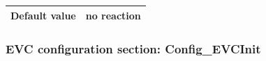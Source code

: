 \documentclass{template/openetcs}
\begin{document}
\begin{itemize}
\begin{longtable}{|l|l|}
				\hline
										
					\begin{minipage}[t]{0.22\linewidth} \textbf{Default value}	\end{minipage} 
				&	\begin{minipage}[t]{0.78\linewidth} no reaction \end{minipage} \\
				
				\hline
				
			\end{longtable}
		
	\end{itemize}
	
\subsubsection{EVC configuration section: Config\_EVCInit}
\end{document}
